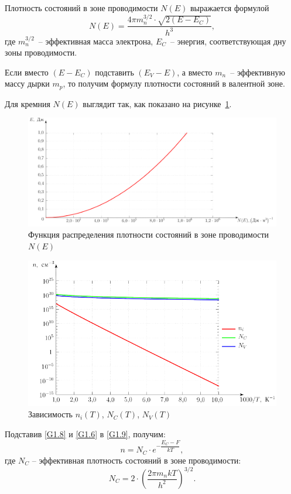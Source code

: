 \documentclass[14pt,a4paper]{extarticle}
\begin{document}
  Плотность состояний в зоне проводимости \( N(E) \) выражается формулой
  \begin{equation}
    N(E) = \frac{4\pi m_n^{3/2}\cdot\sqrt{2(E - E_C)}}{h^3},
    \label{G1.6}
  \end{equation}
  где \( m_n^{3/2} \)~-- эффективная масса электрона, \( E_C \)~-- энергия,
  соответствующая дну зоны проводимости.

  Если вместо \( (E - E_C) \) подставить \( (E_V - E) \), а вместо \( m_n \)~--
  эффективную массу дырки \( m_p \), то получим формулу плотности состояний в
  валентной зоне.

  Для кремния \( N(E) \) выглядит так, как показано на рисунке~\ref{picNE}.
  \begin{figure}[ht]
    \center
    \includegraphics[width=.75\textwidth]{N(E)}
    \caption{Функция распределения плотности состояний в зоне проводимости
      \( N(E) \)}
    \label{picNE}
  \end{figure}

  \begin{figure}[b!]
    \center
    \includegraphics[width=.75\textwidth]{ni}
    \caption{Зависимость \( n_i(T) \), \( N_C(T) \), \( N_V(T) \)}
    \label{picNi}
  \end{figure}

  Подставив \eqref{G1.8} и \eqref{G1.6} в \eqref{G1.9}, получим:
  \begin{equation}
    n = N_C\cdot e^{-\dfrac{E_C - F}{kT}},
    \label{G1.10}
  \end{equation}
  где \( N_C \) -- эффективная плотность состояний в зоне проводимости:
  \[
    N_C = 2\cdot\left (\frac{2\pi m_n kT}{h^2} \right)^{3/2}.
  \]
\end{document}
